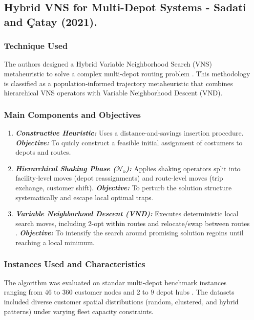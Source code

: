 \documentclass[conference]{IEEEtran}
\begin{document}
\subsection{Hybrid VNS for Multi-Depot Systems - Sadati and Çatay (2021).}
\cite{sadati2021hybrid}

\subsubsection{Technique Used}
The authors designed a Hybrid Variable Neighborhood Search (VNS) metaheuristic to solve a complex multi-depot routing problem \cite{sadati2021hybrid}. This methodology is classified as a population-informed trajectory metaheuristic that combines hierarchical VNS operators with Variable Neighborhood Descent (VND).

\subsubsection{Main Components and Objectives}
\begin{enumerate}
    \item \textbf{\textit{Constructive Heuristic:}} Uses a distance-and-savings insertion procedure. \textit{\textbf{Objective:}} To quicly construct a feasible initial assignment of costumers to depots and routes.
    
    \item \textbf{\textit{Hierarchical Shaking Phase ($\mathcal{N}_k$):}} Applies shaking operators split into facility-level moves (depot reassignments) and route-level moves (trip exchange, customer shift).
    \textbf{\textit{Objective:}} To perturb the solution structure systematically and escape local optimal traps.

    \item \textbf{\textit{Variable Neighborhood Descent (VND):}} Executes deterministic local search moves, including 2-opt within routes and relocate/swap between routes \cite{sadati2021hybrid}.
    \textbf{\textit{Objective:}} To intensify the search around promising solution regoins until reaching a local minimum.

\end{enumerate}

\subsubsection{Instances Used and Characteristics}
The algorithm was evaluated on standar multi-depot benchmark instances ranging from 46 to 360 customer nodes and 2 to 9 depot hubs \cite{sadati2021hybrid}. The datasets included diverse customer spatial distributions (random, clustered, and hybrid patterns) under varying fleet capacity constraints.
\end{document}
